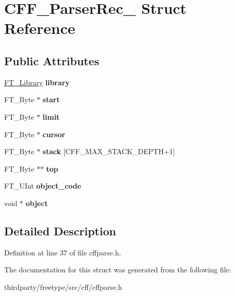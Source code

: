 \hypertarget{struct_c_f_f___parser_rec__}{}\section{C\+F\+F\+\_\+\+Parser\+Rec\+\_\+ Struct Reference}
\label{struct_c_f_f___parser_rec__}
\subsection*{Public Attributes}
\begin{DoxyCompactItemize}
\item 
\mbox{\label{struct_c_f_f___parser_rec___ae2edcd418c21004a391e07134307f4bf}} 
\hyperlink{struct_f_t___library_rec__}{F\+T\+\_\+\+Library} {\bfseries library}
\item 
\mbox{\label{struct_c_f_f___parser_rec___ab3c269c1747f86c68923c1b584317c4a}} 
F\+T\+\_\+\+Byte $\ast$ {\bfseries start}
\item 
\mbox{\label{struct_c_f_f___parser_rec___a08ed6bbbae074a5787484aa3f41d1177}} 
F\+T\+\_\+\+Byte $\ast$ {\bfseries limit}
\item 
\mbox{\label{struct_c_f_f___parser_rec___acc3150914f89420516cf626ab5c671d9}} 
F\+T\+\_\+\+Byte $\ast$ {\bfseries cursor}
\item 
\mbox{\label{struct_c_f_f___parser_rec___a82ff05fbb7555549ca7a809f32f951fa}} 
F\+T\+\_\+\+Byte $\ast$ {\bfseries stack} \mbox{[}C\+F\+F\+\_\+\+M\+A\+X\+\_\+\+S\+T\+A\+C\+K\+\_\+\+D\+E\+P\+TH+1\mbox{]}
\item 
\mbox{\label{struct_c_f_f___parser_rec___aa4729636d680aa22da6289747bfc1d28}} 
F\+T\+\_\+\+Byte $\ast$$\ast$ {\bfseries top}
\item 
\mbox{\label{struct_c_f_f___parser_rec___ab7ea9ac51d4a64309786f50f5bf3eb93}} 
F\+T\+\_\+\+U\+Int {\bfseries object\+\_\+code}
\item 
\mbox{\label{struct_c_f_f___parser_rec___a33bc31ef366f1967ea9c0d96d5dd4147}} 
void $\ast$ {\bfseries object}
\end{DoxyCompactItemize}


\subsection{Detailed Description}


Definition at line 37 of file cffparse.\+h.



The documentation for this struct was generated from the following file\+:\begin{DoxyCompactItemize}
\item 
thirdparty/freetype/src/cff/cffparse.\+h\end{DoxyCompactItemize}

